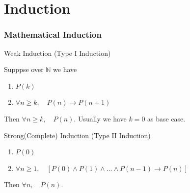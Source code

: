 \documentclass{beamer}
\begin{document}
\section{Induction}
\begin{frame}
    \frametitle{Mathematical Induction}
    \begin{block}{Weak Induction (Type I Induction)}

        Supppse over $\mathbb{N}$ we have
        \begin{enumerate}
            \item $P(k)$
            \item $\forall n \geq k, \quad P(n) \rightarrow P(n+1)$
        \end{enumerate}
    
        Then $\forall n \geq k, \quad P(n)$. Usually we have $k=0$ as base case.
    \end{block}
    
    \begin{block}{Strong(Complete) Induction (Type II Induction)}
        \begin{enumerate}
            \item $P(0)$
            \item $\forall n \geq 1, \quad [P(0) \wedge P(1)\wedge \dots \wedge P(n-1) \rightarrow P(n)]$
        \end{enumerate}
        Then $\forall n, \quad P(n)$.
    \end{block}
    

\end{frame}
\end{document}
